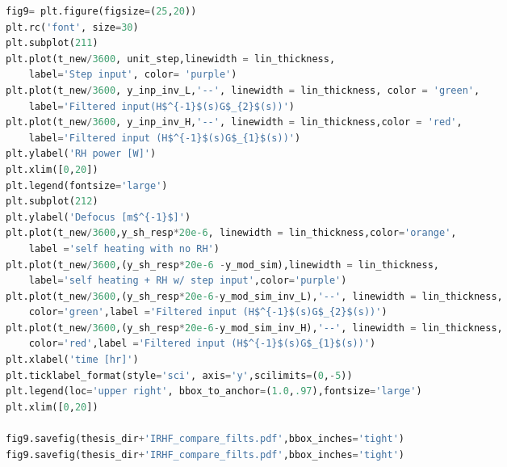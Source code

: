 \begin{spacing}{1.2} \begin{lstlisting}[frame=single,language=Python]
fig9= plt.figure(figsize=(25,20))
plt.rc('font', size=30)
plt.subplot(211)
plt.plot(t_new/3600, unit_step,linewidth = lin_thickness,
    label='Step input', color= 'purple')
plt.plot(t_new/3600, y_inp_inv_L,'--', linewidth = lin_thickness, color = 'green',
    label='Filtered input(H$^{-1}$(s)G$_{2}$(s))')
plt.plot(t_new/3600, y_inp_inv_H,'--', linewidth = lin_thickness,color = 'red', 
    label='Filtered input (H$^{-1}$(s)G$_{1}$(s))')
plt.ylabel('RH power [W]')
plt.xlim([0,20])
plt.legend(fontsize='large')
plt.subplot(212)
plt.ylabel('Defocus [m$^{-1}$]')
plt.plot(t_new/3600,y_sh_resp*20e-6, linewidth = lin_thickness,color='orange',
    label ='self heating with no RH')
plt.plot(t_new/3600,(y_sh_resp*20e-6 -y_mod_sim),linewidth = lin_thickness,
    label='self heating + RH w/ step input',color='purple')
plt.plot(t_new/3600,(y_sh_resp*20e-6-y_mod_sim_inv_L),'--', linewidth = lin_thickness,
    color='green',label ='Filtered input (H$^{-1}$(s)G$_{2}$(s))')
plt.plot(t_new/3600,(y_sh_resp*20e-6-y_mod_sim_inv_H),'--', linewidth = lin_thickness,
    color='red',label ='Filtered input (H$^{-1}$(s)G$_{1}$(s))')
plt.xlabel('time [hr]')
plt.ticklabel_format(style='sci', axis='y',scilimits=(0,-5))
plt.legend(loc='upper right', bbox_to_anchor=(1.0,.97),fontsize='large')
plt.xlim([0,20])

fig9.savefig(thesis_dir+'IRHF_compare_filts.pdf',bbox_inches='tight')
fig9.savefig(thesis_dir+'IRHF_compare_filts.pdf',bbox_inches='tight')
\end{lstlisting} \end{spacing}


